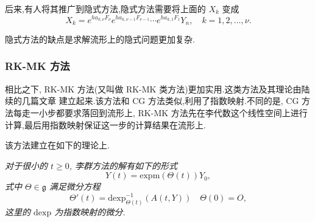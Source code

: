 后来,有人将其推广到隐式方法,隐式方法需要将上面的 $X_k$ 变成
\begin{equation*}
	X_k=e^{ha_{k,\nu}F_{\nu}}e^{ha_{k,\nu-1}F_{\nu-1}}\cdots e^{ha_{k,1}F_{1}}Y_n,\quad k=1,2,\ldots,\nu.
\end{equation*}

隐式方法的缺点是求解流形上的隐式问题更加复杂.

\subsubsection{RK-MK 方法}
相比之下, RK-MK 方法(又叫做 RK-MK 类方法)更加实用.这类方法及其理论由陆续的几篇文章 \cite{mk1996lie,mk1997numerical,mk1998runge,mk1999high} 建立起来.该方法和 CG 方法类似,利用了指数映射.不同的是, CG 方法每走一小步都要求落回到流形上, RK-MK 方法先在李代数这个线性空间上进行计算,最后用指数映射保证这一步的计算结果在流形上.

该方法建立在如下的理论上.
\begin{theorem}
	\emph{对于很小的 $t\geq 0$, 李群方法的解有如下的形式
	\begin{equation*}
		Y(t)=\mbox{expm}(\Theta(t))Y_0,
	\end{equation*}
	式中 $\Theta \in \mathfrak{g}$ 满足微分方程
	\begin{equation*}
		\Theta'(t)=\mbox{dexp}_{\Theta(t)}^{-1}(A(t,Y))\quad \Theta(0)=O,
	\end{equation*}
	这里的 $\mbox{dexp}$ 为指数映射的微分.}
\end{theorem}

